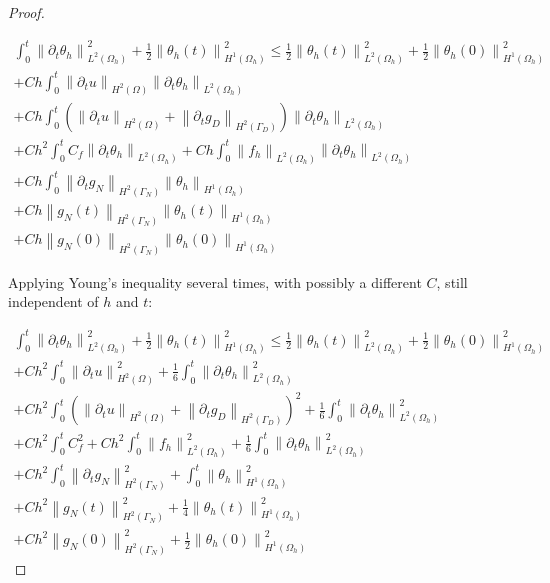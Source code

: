 \documentclass[english,a4paper,10pt,oneside]{scrbook}	%
\theoremstyle{break}
\newenvironment{mproof}[1][\proofname]{%
  \begin{proof}[#1]$ $\par\nobreak\ignorespaces
}{%
  \end{proof}
}
\renewcommand*{\proofname}{Proof}
\theoremstyle{remark}
\newcommand{\norm}[1]{\left\lVert#1\right\rVert}
\begin{document}
\begin{mproof}
\begin{align*}
\int_0^t\norm{\partial_t \theta_h}^2_{L^2(\Omega_h)} + \frac{1}{2} \norm{\theta_h(t)}_{H^1(\Omega_h)}^2 \leq  \frac{1}{2} \norm{\theta_h(t)}_{L^2(\Omega_h)}^2 + \frac{1}{2} \norm{\theta_h(0)}_{H^1(\Omega_h)}^2\\
+ Ch\int_0^t \norm{\partial_t u}_{H^2(\Omega)}\norm{\partial_t \theta_h}_{L^2(\Omega_h)}\\
+ Ch\int_0^t(\norm{\partial_t u}_{H^2(\Omega)}+	\norm{\partial_t g_D}_{H^2(\Gamma_D)})\norm{\partial_t \theta_h}_{L^2(\Omega_h)}\\
+ Ch^2\int_0^t C_f\norm{\partial_t \theta_h}_{L^2(\Omega_h)}+ Ch\int_0^t \norm{f_h}_{L^2(\Omega_h)}\norm{\partial_t \theta_h}_{L^2(\Omega_h)}\\ 
+ Ch\int_0^t \norm{\partial_t g_N}_{H^2(\Gamma_N)}\norm{ \theta_h}_{H^1(\Omega_h)}\\
+ Ch\norm{g_N(t)}_{H^2(\Gamma_N)}\norm{ \theta_h(t)}_{H^1(\Omega_h)}\\
+ Ch\norm{g_N(0)}_{H^2(\Gamma_N)}\norm{ \theta_h(0)}_{H^1(\Omega_h)}
\end{align*}

Applying Young's inequality several times, with possibly a different $C$, still independent of $h$ and $t$:

\begin{align*}
\int_0^t\norm{\partial_t \theta_h}^2_{L^2(\Omega_h)} + \frac{1}{2} \norm{\theta_h(t)}_{H^1(\Omega_h)}^2 \leq  \frac{1}{2} \norm{\theta_h(t)}_{L^2(\Omega_h)}^2 + \frac{1}{2} \norm{\theta_h(0)}_{H^1(\Omega_h)}^2\\
+ Ch^2\int_0^t \norm{\partial_t u}_{H^2(\Omega)}^2 + \frac{1}{6}\int_0^t\norm{\partial_t \theta_h}^2_{L^2(\Omega_h)}\\
+ Ch^2\int_0^t(\norm{\partial_t u}_{H^2(\Omega)}+	\norm{\partial_t g_D}_{H^2(\Gamma_D)})^2 + \frac{1}{6} \int_0^t\norm{\partial_t \theta_h}_{L^2(\Omega_h)}^2\\
+ Ch^2\int_0^t C_f^2+ Ch^2\int_0^t \norm{f_h}_{L^2(\Omega_h)}^2  + \frac{1}{6}\int_0^t\norm{\partial_t \theta_h}^2_{L^2(\Omega_h)}\\ 
+ Ch^2\int_0^t \norm{\partial_t g_N}_{H^2(\Gamma_N)}^2 + \int_0^t \norm{ \theta_h}_{H^1(\Omega_h)}^2\\
+ Ch^2\norm{g_N(t)}_{H^2(\Gamma_N)}^2 + \frac{1}{4}\norm{ \theta_h(t)}_{H^1(\Omega_h)}^2\\
+ Ch^2\norm{g_N(0)}_{H^2(\Gamma_N)}^2 + \frac{1}{2}\norm{ \theta_h(0)}_{H^1(\Omega_h)}^2
\end{align*}


\end{mproof}
\end{document}
